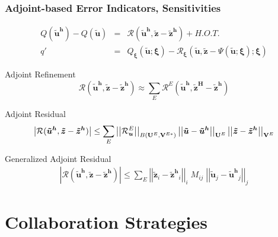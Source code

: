 \documentclass[mathserif]{beamer}
\newcommand{\abs}[1]{\ensuremath{ \left|#1\right|}}
\newcommand{\norm}[1]{\ensuremath{ \left|\left|#1\right|\right|}}
\newcommand{\bv}[1]{{\boldsymbol{#1}}}
\newcommand{\Qoi}{{\ensuremath{Q}}}
\newcommand{\qoi}{{\ensuremath{q}}}
\newcommand{\Res}{{\ensuremath{\mathcal R}}}
\newcommand{\params}{{\ensuremath{\bv{\xi}}}}
\newcommand{\Unknowns}{{\ensuremath{\bf{U}}}}
\newcommand{\unknown}{{\ensuremath{\bv{u}}}}
\newcommand{\Testfuncs}{{\ensuremath{\bf{V}}}}
\newcommand{\primalsol}{{\ensuremath{\bv{\tilde{u}}}}}
\newcommand{\primalsolh}{{\ensuremath{\bv{\tilde{u}^h}}}}
\newcommand{\adjointsol}{{\ensuremath{\bv{\tilde{z}}}}}
\newcommand{\adjointsolh}{{\ensuremath{\bv{\tilde{z}^h}}}}
\newcommand{\adjointsolH}{{\ensuremath{\bv{\tilde{z}^H}}}}
\newcommand{\Liftfunc}{{\ensuremath{\Psi}}}
\newcommand{\elem}{\ensuremath{E}}
\begin{document}
\begin{frame}
\frametitle{Adjoint-based Error Indicators, Sensitivities}

\vspace{-5mm}

\begin{eqnarray*}
\Qoi(\primalsolh) - \Qoi(\primalsol) & = & \Res(\primalsolh, \adjointsol - \adjointsolh) + H.O.T. \\
\qoi' & = & \Qoi_\params(\primalsol; \params) - 
        \Res_\params(\primalsol, \adjointsol - \Liftfunc(\primalsol; \params); \params)
\end{eqnarray*}

\begin{block}{Adjoint Refinement}
\begin{equation*}
\Res(\primalsolh, \adjointsol - \adjointsolh) \approx \sum_\elem 
\Res^\elem(\primalsolh, \adjointsolH - \adjointsolh)
\end{equation*}
\end{block}

\begin{block}{Adjoint Residual}
\vspace{-4mm}
\begin{equation*}
\abs{\Res(\primalsolh, \adjointsol - \adjointsolh)} \leq
\sum_\elem \norm{\Res^\elem_\unknown}_{B(\Unknowns^\elem,
\Testfuncs^{\elem *})}
\norm{\primalsol - \primalsolh}_{\Unknowns^\elem}
\norm{\adjointsol - \adjointsolh}_{\Testfuncs^\elem}
\end{equation*}
\end{block}

\begin{block}{Generalized Adjoint Residual}
\vspace{-4mm}
\begin{align*}
\abs{\Res(\primalsolh, \adjointsol - \adjointsolh)}
\leq \sum_\elem \norm{\adjointsol_i-\adjointsolh_i}_i \; M_{ij} \; \norm{\primalsol_j-\primalsolh_j
}_j \nonumber
\end{align*}
\end{block}

\end{frame}



\section{Collaboration Strategies}
\end{document}

